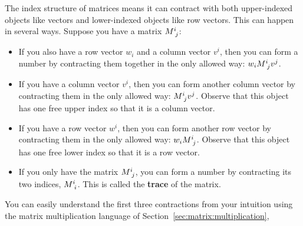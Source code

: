 The index structure of matrices means it can contract with both upper-indexed objects like vectors and lower-indexed objects like row vectors. This can happen in several ways. Suppose you have a matrix $M\aij{i}{j}$:
\begin{itemize}
    \item If you also have a row vector $w_i$ and a column vector $v^i$, then you can form a number by contracting them together in the only allowed way: $w_i M\aij{i}{j}v^j$.
    \item If you have a column vector $v^i$, then you can form another column vector by contracting them in the only allowed way: $M\aij{i}{j}v^j$. Observe that this object has one free upper index so that it is a column vector.
    \item If you have a row vector $w^i$, then you can form another row vector by contracting them in the only allowed way: $w_iM\aij{i}{j}$. Observe that this object has one free lower index so that it is a row vector.
    \item If you only have the matrix $M\aij{i}{j}$, you can form a number by contracting its two indices, $M\aij{i}{i}$. This is called the \textbf{trace} of the matrix.
\end{itemize}
You can easily understand the first three contractions from your intuition using the matrix multiplication language of Section~\ref{sec:matrix:multiplication},
